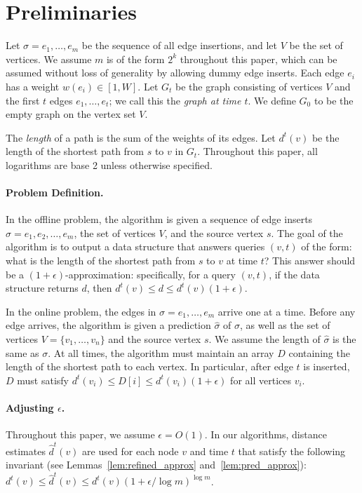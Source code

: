 \section{Preliminaries}
\label{sec:prelim}
Let $\sigma = e_1, \ldots, e_m$ be the sequence of all edge insertions, and let $V$ be the set of vertices. 
We assume $m$ is of the form $2^k$ throughout this paper, which can be assumed without loss of generality by allowing dummy edge inserts.
Each edge $e_i$ has a weight $w(e_i) \in [1, W]$.
Let $G_t$ be the graph consisting of vertices $V$ and the first $t$ edges $e_1, \ldots, e_t$; we call this the \emph{graph at time $t$}. 
We define $G_0$ to be the empty graph on the vertex set $V$.

The \emph{length} of a path is the sum of the weights of its edges. 
Let $d^t(v)$ be the length of the shortest path from $s$ to $v$ in $G_t$. 
Throughout this paper, all logarithms are base 2 unless otherwise specified.

\paragraph{Problem Definition.}
In the offline problem, the algorithm is given a sequence of edge inserts $\sigma = e_1, e_2, \ldots, e_m$, the set of vertices $V$, and the source vertex $s$.  The goal of the algorithm is to output a data structure that answers queries $(v,t)$ of the form: what is the length of the shortest path from $s$ to $v$ at time $t$?  This answer should be a $(1 + \epsilon)$-approximation: specifically, for a query $(v, t)$, if the data structure returns $d$, then ${d}^t(v) \leq d \leq d^t(v)(1 + \epsilon)$.

In the online problem, the edges in $\sigma = e_1, \ldots, e_m$ arrive one at a time.  Before any edge arrives, the algorithm is given a prediction $\hat{\sigma}$ of $\sigma$, as well as the set of vertices $V=\{v_1,\ldots,v_n\}$ and the source vertex $s$.  
We assume the length of $\hat{\sigma}$ is the same as $\sigma$.
At all times, the algorithm must maintain an array $D$ containing the length of the shortest path to each vertex.  In particular, after edge $t$ is inserted, $D$ must satisfy $d^t(v_i)\leq D[i] \leq d^t(v_i)(1 + \epsilon)$ for all vertices $v_i$.

\paragraph{Adjusting $\epsilon$.}
Throughout this paper, we assume $\epsilon = O(1)$.
In our algorithms, distance estimates $\hat{d}^t(v)$ are used for each node $v$ and time $t$ that satisfy the following invariant (see Lemmas~\ref{lem:refined_approx} and~\ref{lem:pred_approx}):
$d^t(v) \leq \hat{d}^t(v) \leq d^t(v)(1 + \epsilon/ \log m)^{\log m}$.

